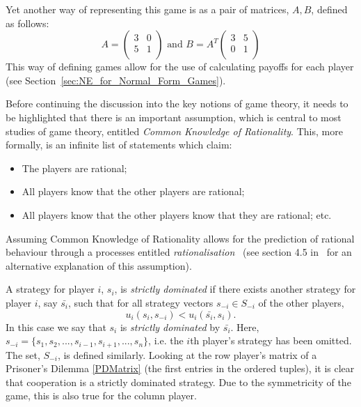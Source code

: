 Yet another way of representing this game is as a pair of matrices, \(A, B\),
defined as follows:
\[
    A = 
    \begin{pmatrix}
       3 & 0\\
       5 & 1\\ 
    \end{pmatrix}
    \text{ and } B = A^{T}
    \begin{pmatrix}
        3 & 5\\
        0 & 1\\
    \end{pmatrix}
\]
This way of defining games allow for the use of calculating payoffs for each
player (see Section~\ref{sec:NE_for_Normal_Form_Games}).

Before continuing the discussion into the key notions of game theory, it needs
to be highlighted that there is an important assumption, which is central to
most studies of game theory, entitled \textit{Common Knowledge of Rationality}.
This, more formally, is an infinite list of statements which claim:
    \begin{itemize}
        \item The players are rational;
        \item All players know that the other players are rational;
        \item All players know that the other players know that they are rational; etc.    
    \end{itemize}
Assuming Common Knowledge of Rationality allows for the prediction of rational
behaviour through a processes entitled \textit{rationalisation}~\cite{Knight2019}
(see section 4.5 in~\cite{maschler_solan_zamir_2013} for an alternative
explanation of this assumption). 


A strategy for player \(i\), \(s_{i}\), is \textit{strictly dominated} if there
exists another strategy for player \(i\), say \(\bar{s_{i}}\), such that for all
strategy vectors \(s_{-i} \in S_{-i}\) of the other players, 
\[
    u_{i}(s_{i}, s_{-i}) < u_{i}(\bar{s_{i}}, s_{i}).
\]
In this case we say that \(s_{i}\) is \textit{strictly dominated} by
\(\bar{s_{i}}\). Here, \(s_{-i} = \{s_{1}, s_{2}, ..., s_{i-1}, s_{i+1}, ...,
s_{n}\}\), i.e. the \(i\)th player's strategy has been omitted. The set, \(S_{-i}\),
is defined similarly. Looking at the row player's matrix of a Prisoner's Dilemma
\ref{PDMatrix} (the first entries in the ordered tuples), it is clear that
cooperation is a strictly dominated strategy. Due to the symmetricity of the
game, this is also true for the column player.~\cite{maschler_solan_zamir_2013}



